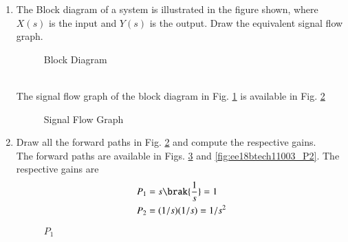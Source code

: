 \begin{enumerate}[label=\thesection.\arabic*.,ref=\thesection.\theenumi]

\item The Block diagram of a system is illustrated in the figure shown, where $X(s)$ is the input and $Y(s)$ is the output.  Draw the equivalent signal flow graph. 
\renewcommand{\thefigure}{\theenumi.\arabic{figure}}
%
\begin{figure}[!ht]
    \begin{center}
		
		\resizebox{\columnwidth}{!}{}
	\end{center}
\caption{Block Diagram}
\label{fig:ee18btech11003_block_diagram}
\end{figure}
\\
\solution The signal flow graph of the block diagram in Fig. \ref{fig:ee18btech11003_block_diagram} is available in Fig. \ref{fig:ee18btech11003_signal_flow}
%
\begin{figure}[!ht]
\begin{center}
		
		\resizebox{\columnwidth}{!}{}
	\end{center}
\caption{Signal Flow Graph}
\label{fig:ee18btech11003_signal_flow}
\end{figure}
%
\renewcommand{\thefigure}{\theenumi}
\item Draw all the forward paths in Fig. \ref{fig:ee18btech11003_signal_flow}
and compute the respective gains.
\renewcommand{\thefigure}{\theenumi.\arabic{figure}}
\\
\solution The forward paths are available in Figs. \ref{fig:ee18btech11003_P1}
 and \ref{fig:ee18btech11003_P2}.  The respective gains are
\begin{align}
P_1&=s \brak{\frac{1}{s}}=1
\\
P_2&=(1/s)(1/s)=1/s^2
\end{align}
%
\begin{figure}[!ht]
\begin{center}
		
		\resizebox{\columnwidth}{!}{}
	\end{center}
\caption{$P_1$}
\label{fig:ee18btech11003_P1}
\end{figure}
%
\begin{figure}[!ht]
\begin{center}
		

\end{center}
\end{figure}
\end{enumerate}
